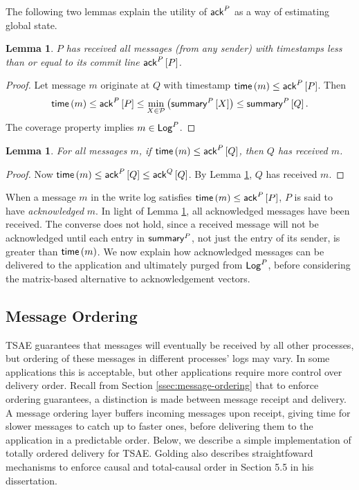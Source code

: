 \documentclass[]             %
{NASA}                       %
\newtheorem{lemma}[theorem]{Lemma}
\theoremstyle{definition}
\begin{document}
The following two lemmas explain the utility of $\mathsf{ack}^{P}$ as a way
of estimating global state.

\begin{lemma}
  \label{lem:commitline}
  $P$ has received all messages (from any sender) with timestamps less
  than or equal to its commit line $\mathsf{ack}^{P}\left[P\right]$.
\end{lemma}
\begin{proof}
  Let message $m$ originate at $Q$ with timestamp
  $\mathsf{time}\left(m\right) \leq \mathsf{ack}^{P}\left[P\right]$. Then
  \[\mathsf{time}\left(m\right) \leq \mathsf{ack}^{P}\left[P\right] \leq \min_{X \in
      \mathcal{P}}\left(\mathsf{summary}^{P}\left[X\right]\right) \leq\mathsf{summary}^{P}\left[Q\right].\] The
  coverage property implies $m \in \mathsf{Log}^{P}$.
\end{proof}

\begin{lemma}
  \label{lem:ack-vector}
  For all messages $m$, if $\mathsf{time}\left(m\right) \leq \mathsf{ack}^{P}\left[Q\right]$, then $Q$
  has received $m$.
\end{lemma}
\begin{proof}
  Now $\mathsf{time}\left(m\right) \leq \mathsf{ack}^{P}\left[Q\right] \leq \mathsf{ack}^{Q}\left[Q\right]$. By Lemma
  \ref{lem:commitline}, $Q$ has received $m$.
\end{proof}


When a message $m$ in the write log satisfies
$\mathsf{time}\left(m\right) \leq \mathsf{ack}^{P}\left[P\right]$, $P$ is said to have
\emph{acknowledged} $m$. In light of Lemma \ref{lem:commitline}, all
acknowledged messages have been received. The converse does not hold,
since a received message will not be acknowledged until each entry in
$\mathsf{summary}^{P}$, not just the entry of its sender, is greater than
$\mathsf{time}\left(m\right)$. We now explain how acknowledged messages can be
delivered to the application and ultimately purged from $\mathsf{Log}^{P}$,
before considering the matrix-based alternative to acknowledgement
vectors.

\subsection{Message Ordering}
\label{ssec:tsae-message-ordering}
TSAE guarantees that messages will eventually be received by all other
processes, but ordering of these messages in different processes' logs
may vary. In some applications this is acceptable, but other
applications require more control over delivery order. Recall from
Section \ref{ssec:message-ordering} that to enforce ordering
guarantees, a distinction is made between message receipt and
delivery. A message ordering layer buffers incoming messages upon
receipt, giving time for slower messages to catch up to faster ones,
before delivering them to the application in a predictable
order. Below, we describe a simple implementation of totally ordered
delivery for TSAE. Golding also describes straightfoward mechanisms to
enforce causal and total-causal order in Section 5.5 in his
dissertation.
\end{document}
